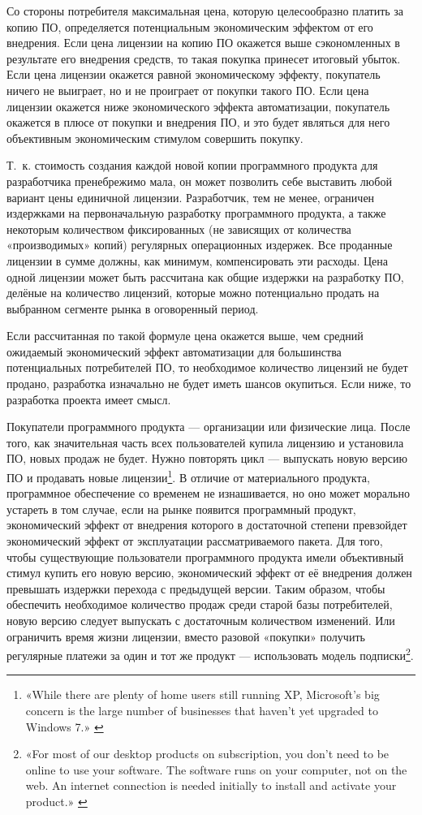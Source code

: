 \documentclass{article}
\begin{document}
Со стороны потребителя максимальная цена, которую целесообразно платить за копию ПО, определяется потенциальным экономическим эффектом от его внедрения. Если цена лицензии на копию ПО окажется выше сэкономленных в результате его внедрения средств, то такая покупка принесет итоговый убыток. Если цена лицензии окажется равной экономическому эффекту, покупатель ничего не выиграет, но и не проиграет от покупки такого ПО. Если цена лицензии окажется ниже экономического эффекта автоматизации, покупатель окажется в плюсе от покупки и внедрения ПО, и это будет являться для него объективным экономическим стимулом совершить покупку.

Т.~к. стоимость создания каждой новой копии программного продукта для разработчика пренебрежимо мала, он может позволить себе выставить любой вариант цены единичной лицензии. Разработчик, тем не менее, ограничен издержками на первоначальную разработку программного продукта, а также некоторым количеством фиксированных (не зависящих от количества «производимых» копий) регулярных операционных издержек. Все проданные лицензии в сумме должны, как минимум, компенсировать эти расходы. Цена одной лицензии может быть рассчитана как общие издержки на разработку ПО, делёные на количество лицензий, которые можно потенциально продать на выбранном сегменте рынка в оговоренный период.

Если рассчитанная по такой формуле цена окажется выше, чем средний ожидаемый экономический эффект автоматизации для большинства потенциальных потребителей ПО, то необходимое количество лицензий не будет продано, разработка изначально не будет иметь шансов окупиться. Если ниже, то разработка проекта имеет смысл.

Покупатели программного продукта — организации или физические лица. После того, как значительная часть всех пользователей купила лицензию и установила ПО, новых продаж не будет. Нужно повторять цикл — выпускать новую версию ПО и продавать новые лицензии\footnote{«While there are plenty of home users still running XP, Microsoft’s big concern is the large number of businesses that haven’t yet upgraded to Windows 7.» \cite{windowsXPLegacy}}. В отличие от материального продукта, программное обеспечение со временем не изнашивается, но оно может морально устареть в том случае, если на рынке появится программный продукт, экономический эффект от внедрения которого в достаточной степени превзойдет экономический эффект от эксплуатации рассматриваемого пакета. Для того, чтобы существующие пользователи программного продукта имели объективный стимул купить его новую версию, экономический эффект от её внедрения должен превышать издержки перехода с предыдущей версии. Таким образом, чтобы обеспечить необходимое количество продаж среди старой базы потребителей, новую версию следует выпускать с достаточным количеством изменений. Или ограничить время жизни лицензии, вместо разовой «покупки» получить регулярные платежи за один и тот же продукт — использовать модель подписки\footnote{«For most of our desktop products on subscription, you don't need to be online to use your software. The software runs on your computer, not on the web. An internet connection is needed initially to install and activate your product.» \cite{autodeskSubscription}}.
\end{document}
